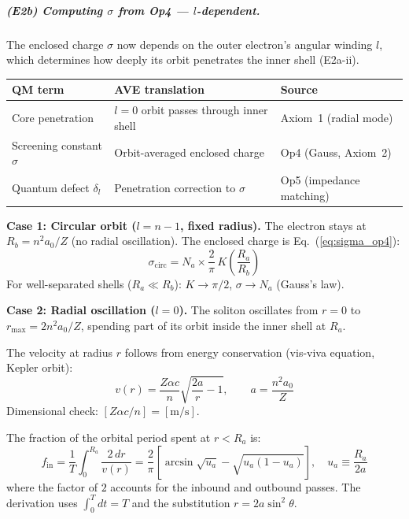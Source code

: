 \subparagraph{(E2b) Computing $\sigma$ from Op4 ---
$l$-dependent.}

The enclosed charge $\sigma$ now depends on the
outer electron's angular winding $l$, which determines
how deeply its orbit penetrates the inner shell
(E2a-ii).

\begin{center}
\small
\renewcommand{\arraystretch}{1.2}
\begin{tabular}{lll}
\hline
\textbf{QM term} & \textbf{AVE translation}
& \textbf{Source} \\
\hline
Core penetration & $l{=}0$ orbit passes through
inner shell & Axiom~1 (radial mode) \\
Screening constant $\sigma$ & Orbit-averaged
enclosed charge & Op4 (Gauss, Axiom~2) \\
Quantum defect $\delta_l$ & Penetration correction
to $\sigma$ & Op5 (impedance matching) \\
\hline
\end{tabular}
\end{center}

\noindent\textbf{Case 1: Circular orbit ($l = n{-}1$,
fixed radius).}
The electron stays at $R_b = n^2 a_0/Z$ (no radial
oscillation).  The enclosed charge is
Eq.~(\ref{eq:sigma_op4}):
\begin{equation}
    \sigma_{\text{circ}} = N_a \times \frac{2}{\pi}\,
    K\!\left(\frac{R_a}{R_b}\right)
    \label{eq:sigma_op4}
\end{equation}
For well-separated shells ($R_a \ll R_b$):
$K \to \pi/2$, $\sigma \to N_a$ (Gauss's law).

\noindent\textbf{Case 2: Radial oscillation ($l = 0$).}
The soliton oscillates from $r = 0$ to
$r_{\max} = 2n^2 a_0/Z$, spending part of its orbit
inside the inner shell at $R_a$.

The velocity at radius $r$ follows from energy
conservation (vis-viva equation, Kepler orbit):
\begin{equation}
    v(r) = \frac{Z\alpha c}{n}\sqrt{\frac{2a}{r} - 1},
    \qquad a = \frac{n^2 a_0}{Z}
    \label{eq:vis_viva}
\end{equation}
Dimensional check: $[Z\alpha c/n]
= [\text{m/s}]$.\;\checkmark

The fraction of the orbital period spent at
$r < R_a$ is:
\begin{equation}
    f_{\text{in}} = \frac{1}{T}
    \int_0^{R_a} \frac{2\,dr}{v(r)}
    = \frac{2}{\pi}\left[\arcsin\!\sqrt{u_a}
    - \sqrt{u_a(1-u_a)}\right],
    \quad u_a \equiv \frac{R_a}{2a}
    \label{eq:f_in}
\end{equation}
where the factor of $2$ accounts for the inbound
and outbound passes.  The derivation uses
$\int_0^T dt = T$ and the substitution
$r = 2a\sin^2\!\theta$.

